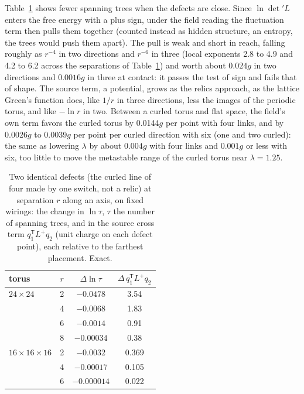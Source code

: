 \documentclass[pre,twocolumn,superscriptaddress,nofootinbib]{revtex4-2}
\begin{document}
Table~\ref{tab:pull} shows fewer spanning trees when the defects are close. Since $\ln\det{}'L$ enters the free energy
with a plus sign, under the field reading the fluctuation term then pulls them together (counted instead as hidden
structure, an entropy, the trees would push them apart). The pull is weak and short
in reach, falling roughly as $r^{-4}$ in two directions and $r^{-6}$ in three (local exponents 2.8 to 4.9 and 4.2 to
6.2 across the separations of Table~\ref{tab:pull}) and worth about $0.024g$ in two directions and $0.0016g$ in three
at contact: it passes the test of sign and fails that of shape. The source term, a potential, grows as the relics
approach, as the lattice Green's function does, like $1/r$ in three directions, less the images of the periodic torus,
and like $-\ln r$ in two. Between a curled torus and flat space, the field's own term favors the curled torus by
0.0144$g$ per point with four links, and by 0.0026$g$ to 0.0039$g$ per point per curled direction with six (one and
two curled): the same as lowering $\lambda$ by about $0.004g$ with four links and $0.001g$ or less with six, too little
to move the metastable range of the curled torus near $\lambda = 1.25$.

\begin{table}[t]
\caption{Two identical defects (the curled line of four made by one switch, not a relic) at separation $r$ along an
axis, on fixed wirings: the change in $\ln\tau$, $\tau$ the number of spanning trees, and in the source cross term
$q_1^{\mathsf T}L^{+}q_2$ (unit charge on each defect point), each relative to the farthest placement. Exact.}
\label{tab:pull}
\begin{ruledtabular}
\begin{tabular}{lccc}
torus & $r$ & $\Delta\ln\tau$ & $\Delta\, q_1^{\mathsf T}L^{+}q_2$ \\
\hline
$24 \times 24$ & 2 & $-0.0478$ & 3.54 \\
 & 4 & $-0.0068$ & 1.83 \\
 & 6 & $-0.0014$ & 0.91 \\
 & 8 & $-0.00034$ & 0.38 \\
$16 \times 16 \times 16$ & 2 & $-0.0032$ & 0.369 \\
 & 4 & $-0.00017$ & 0.105 \\
 & 6 & $-0.000014$ & 0.022 \\
\end{tabular}
\end{ruledtabular}
\end{table}
\end{document}
